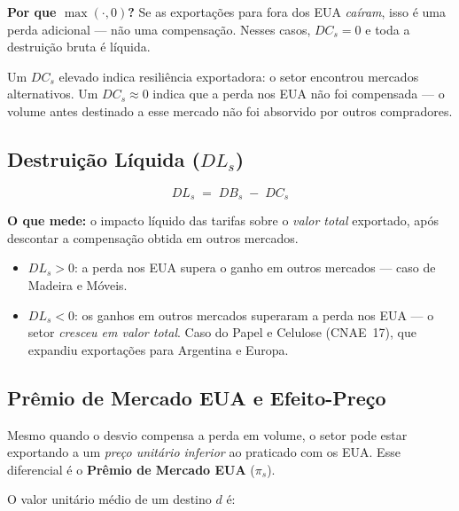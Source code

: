\documentclass[12pt, a4paper]{article}
\begin{document}
\noindent\textbf{Por que $\max(\cdot,0)$?}
Se as exportações para fora dos EUA \emph{caíram}, isso é uma perda adicional
--- não uma compensação. Nesses casos, $DC_s = 0$ e toda a destruição bruta
é líquida.

\begin{interpretabox}
Um $DC_s$ elevado indica resiliência exportadora: o setor encontrou mercados
alternativos. Um $DC_s \approx 0$ indica que a perda nos EUA não foi
compensada --- o volume antes destinado a esse mercado não foi absorvido
por outros compradores.
\end{interpretabox}

\subsection{Destruição Líquida (\texorpdfstring{$DL_s$}{DL})}

\begin{formulabox}
\begin{equation}
  DL_s \;=\; DB_s \;-\; DC_s
  \label{eq:dl}
\end{equation}
\end{formulabox}

\noindent\textbf{O que mede:} o impacto líquido das tarifas sobre o
\emph{valor total} exportado, após descontar a compensação obtida em
outros mercados.

\begin{itemize}[noitemsep]
  \item $DL_s > 0$: a perda nos EUA supera o ganho em outros mercados
    --- caso de Madeira e Móveis.
  \item $DL_s < 0$: os ganhos em outros mercados superaram a perda nos EUA
    --- o setor \emph{cresceu em valor total}. Caso do Papel e Celulose
    (CNAE~17), que expandiu exportações para Argentina e Europa.
\end{itemize}

\subsection{Prêmio de Mercado EUA e Efeito-Preço}
\label{sec:ep}

Mesmo quando o desvio compensa a perda em volume, o setor pode estar
exportando a um \emph{preço unitário inferior} ao praticado com os EUA.
Esse diferencial é o \textbf{Prêmio de Mercado EUA} ($\pi_s$).

O valor unitário médio de um destino $d$ é:
\end{document}
